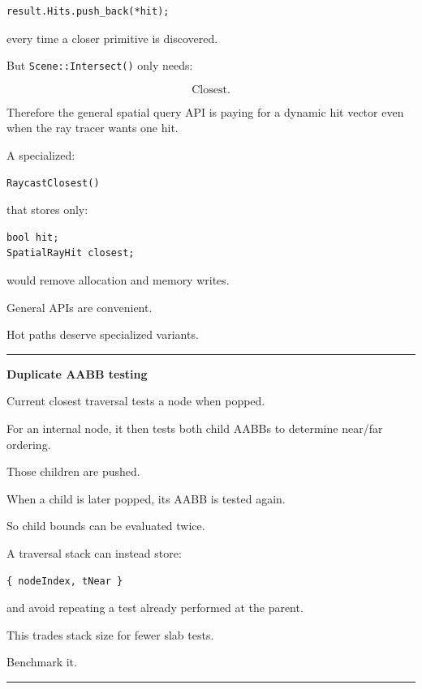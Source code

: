 \begin{verbatim}
result.Hits.push_back(*hit);
\end{verbatim}

every time a closer primitive is discovered.

But \texttt{Scene::Intersect()} only needs:

\[
\text{Closest}.
\]

Therefore the general spatial query API is paying for a dynamic hit vector even when the ray tracer wants one hit.

A specialized:

\begin{verbatim}
RaycastClosest()
\end{verbatim}

that stores only:

\begin{verbatim}
bool hit;
SpatialRayHit closest;
\end{verbatim}

would remove allocation and memory writes.

General APIs are convenient.

Hot paths deserve specialized variants.

\begin{center}\rule{0.5\linewidth}{0.5pt}\end{center}

\textbf{Duplicate AABB testing}

Current closest traversal tests a node when popped.

For an internal node, it then tests both child AABBs to determine near/far ordering.

Those children are pushed.

When a child is later popped, its AABB is tested again.

So child bounds can be evaluated twice.

A traversal stack can instead store:

\begin{verbatim}
{ nodeIndex, tNear }
\end{verbatim}

and avoid repeating a test already performed at the parent.

This trades stack size for fewer slab tests.

Benchmark it.

\begin{center}\rule{0.5\linewidth}{0.5pt}\end{center}

